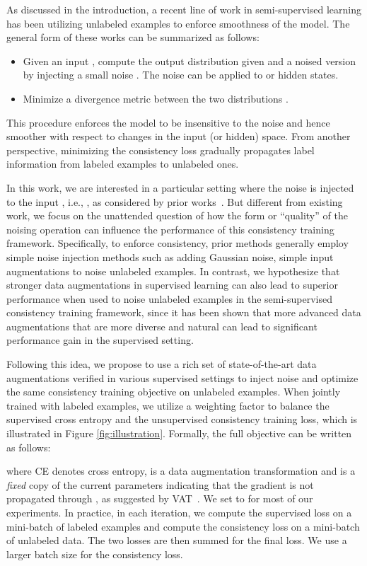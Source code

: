 \documentclass{article}
\begin{document}
As discussed in the introduction, a recent line of work in semi-supervised learning has been utilizing unlabeled examples to enforce smoothness of the model.
The general form of these works can be summarized as follows:
\begin{itemize}[leftmargin=*,itemsep=0em,topsep=0em]
\item Given an input , compute the output distribution  given  and a noised version  by injecting a small noise . 
The noise can be applied to  or hidden states.
\item Minimize a divergence metric between the two distributions .
\end{itemize}
This procedure enforces the model to be insensitive to the noise  and hence smoother with respect to changes in the input (or hidden) space. 
From another perspective, minimizing the consistency loss gradually propagates label information from labeled examples to unlabeled ones.

In this work, we are interested in a particular setting where the noise is injected to the input , i.e., , as considered by prior works~\cite{sajjadi2016regularization, laine2016temporal, miyato2018virtual}.
But different from existing work, we focus on the unattended question of how the form or ``quality'' of the noising operation  can influence the performance of this consistency training framework.
Specifically, to enforce consistency, prior methods generally employ simple noise injection methods such as adding Gaussian noise, simple input augmentations to noise unlabeled examples. 
In contrast, we hypothesize that stronger data augmentations in supervised learning can also lead to superior performance when used to noise unlabeled examples in the semi-supervised consistency training framework, since it has been shown that more advanced data augmentations that are more diverse and natural can lead to significant performance gain in the supervised setting.

Following this idea, we propose to use a rich set of state-of-the-art data augmentations verified in various supervised settings to inject noise and optimize the same consistency training objective on unlabeled examples. When jointly trained with labeled examples, we utilize a weighting factor  to balance the supervised cross entropy and the unsupervised consistency training loss, which is illustrated in Figure \ref{fig:illustration}. Formally, the full objective can be written as follows:

where CE denotes cross entropy,  is a data augmentation transformation and  is a \textit{fixed} copy of the current parameters  indicating that the gradient is not propagated through , as suggested by VAT~\cite{miyato2018virtual}. 
We set  to  for most of our experiments. In practice, in each iteration, we compute the supervised loss on a mini-batch of labeled examples and compute the consistency loss on a mini-batch of unlabeled data. The two losses are then summed for the final loss. We use a larger batch size for the consistency loss. 
\end{document}
